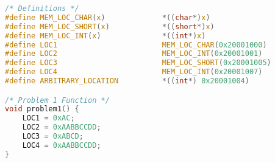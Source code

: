 \begin{lstlisting}[language=c,caption=Problem 1, label=list:p1]
/* Definitions */
#define MEM_LOC_CHAR(x)				*((char*)x)
#define MEM_LOC_SHORT(x)			*((short*)x)
#define MEM_LOC_INT(x)				*((int*)x)
#define LOC1			            MEM_LOC_CHAR(0x20001000)
#define LOC2			            MEM_LOC_INT(0x20001001)
#define LOC3			            MEM_LOC_SHORT(0x20001005)
#define LOC4			            MEM_LOC_INT(0x20001007)
#define ARBITRARY_LOCATION          *((int*) 0x20001004)

/* Problem 1 Function */
void problem1() {
	LOC1 = 0xAC;
	LOC2 = 0xAABBCCDD;
	LOC3 = 0xABCD;
	LOC4 = 0xAABBCCDD;
}
\end{lstlisting}